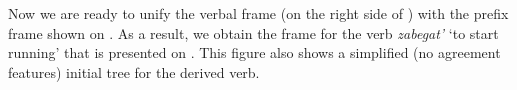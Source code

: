 
Now we are ready to unify the verbal frame (on the right side of ) with the prefix frame shown on . As a result, we obtain the frame for the verb \textit{zabegat'} `to start running' that is presented on . This figure also shows a simplified (no agreement features) initial tree for the derived verb.


